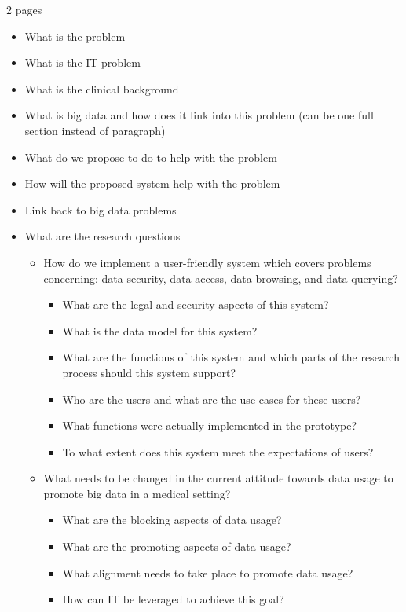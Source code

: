 2 pages

\begin{itemize}
	\item What is the problem	
	\item What is the IT problem
	\item What is the clinical background
	\item What is big data and how  does it link into this problem (can be one full section instead of paragraph)
	\item What do we propose to do to help with the problem
	\item How will the proposed system help with the problem
	\item Link back to big data problems
	\item What are the research questions
	\begin{itemize}
		\item How do we implement a user-friendly system which covers problems concerning: data security, data access, data browsing, and data querying?
		\begin{itemize}
			\item What are the legal and security aspects of this system?
			\item What is the data model for this system?
			\item What are the functions of this system and which parts of the research process should this system support?
			\item Who are the users and what are the use-cases for these users?
			\item What functions were actually implemented in the prototype?
			\item To what extent does this system meet the expectations of users?
		\end{itemize}
		\item What needs to be changed in the current attitude towards data usage to promote big data in a medical setting?
		\begin{itemize}
			\item What are the blocking aspects of data usage?
			\item What are the promoting aspects of data usage?
			\item What alignment needs to take place to promote data usage?
			\item How can IT be leveraged to achieve this goal?
		\end{itemize}
	\end{itemize}
\end{itemize}
